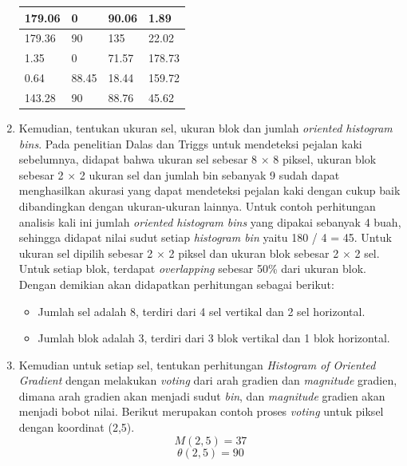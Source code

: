 \begin{enumerate}
\begin{table}[H]
\begin{small}
\begin{tabular}{|p{2cm}|p{2cm}|p{2cm}|p{2cm}|}
			\hline
			179.06 & 0 & 90.06 & 1.89 \\
			\hline
			179.36 & 90 & 135 & 22.02 \\
			\hline
			1.35 & 0 & 71.57 & 178.73 \\
			\hline
			0.64 & 88.45 & 18.44 & 159.72 \\
			\hline
			143.28 & 90 & 88.76 & 45.62 \\
			\hline
		\end{tabular}
	\end{small}
	\label{fig:MatriksHasilPerhitunganArah}
\end{table}
\item Kemudian, tentukan ukuran sel, ukuran blok dan jumlah \textit{oriented histogram bins}. Pada penelitian Dalas dan Triggs untuk mendeteksi pejalan kaki sebelumnya, didapat bahwa ukuran sel sebesar 8 $\times$ 8 piksel, ukuran blok sebesar 2 $\times$ 2 ukuran sel dan jumlah bin sebanyak 9 sudah dapat menghasilkan akurasi yang dapat mendeteksi pejalan kaki dengan cukup baik dibandingkan dengan ukuran-ukuran lainnya. Untuk contoh perhitungan analisis kali ini jumlah \textit{oriented histogram bins} yang dipakai sebanyak 4 buah, sehingga didapat nilai sudut setiap \textit{histogram bin} yaitu 180 / 4 = 45. Untuk ukuran sel dipilih sebesar 2 $\times$ 2 piksel dan ukuran blok sebesar 2 $\times$ 2 sel. Untuk setiap blok, terdapat \textit{overlapping} sebesar 50\% dari ukuran blok. Dengan demikian akan didapatkan perhitungan sebagai berikut:
\begin{itemize}
\item Jumlah sel adalah 8, terdiri dari 4 sel vertikal dan 2 sel horizontal.
\item Jumlah blok adalah 3, terdiri dari 3 blok vertikal dan 1 blok horizontal.
\end{itemize}
\item Kemudian untuk setiap sel, tentukan perhitungan \textit{Histogram of Oriented Gradient} dengan melakukan \textit{voting} dari arah gradien dan \textit{magnitude} gradien, dimana arah gradien akan menjadi sudut \textit{bin}, dan \textit{magnitude} gradien akan menjadi bobot nilai. Berikut merupakan contoh proses \textit{voting} untuk piksel dengan koordinat (2,5).
\begin{equation*}
M(2,5) = 37
\end{equation*}
\begin{equation*}
\theta(2,5) = 90
\end{equation*}

\end{enumerate}
